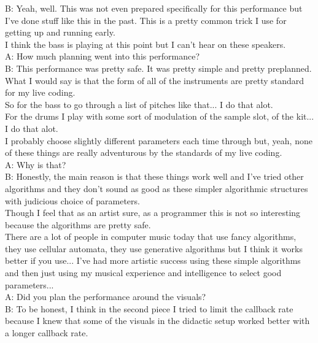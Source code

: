 B: Yeah, well. This was not even prepared specifically for this performance but I've done stuff like this in the past. This is a pretty common trick I use for getting up and running early.\\

I think the bass is playing at this point but I can't hear on these speakers.\\

A: How much planning went into this performance?\\

B: This performance was pretty safe. It was pretty simple and pretty preplanned. What I would say is that the form of all of the instruments are pretty standard for my live coding.\\

So for the bass to go through a list of pitches like that... I do that alot.\\

For the drums I play with some sort of modulation of the sample slot, of the kit... I do that alot.\\

I probably choose slightly different parameters each time through but, yeah, none of these things are really adventurous by the standards of my live coding.\\

A: Why is that?\\

B: Honestly, the main reason is that these things work well and I've tried other algorithms and they don't sound as good as these simpler algorithmic structures with judicious choice of parameters.\\

Though I feel that as an artist sure, as a programmer this is not so interesting because the algorithms are pretty safe.\\

There are a lot of people in computer music today that use fancy algorithms, they use cellular automata, they use generative algorithms but I think it works better if you use... I've had more artistic success using these simple algorithms and then just using my musical experience and intelligence to select good parameters...\\

A: Did you plan the performance around the visuals?\\

B: To be honest, I think in the second piece I tried to limit the callback rate because I knew that some of the visuals in the didactic setup worked better with a longer callback rate.\\

